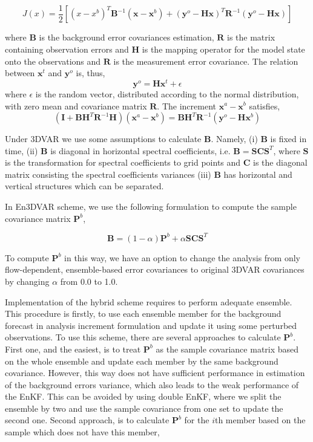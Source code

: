 \documentclass[a4,12pt]{article}
\numberwithin{equation}{section}
\begin{document}
$$J(x) = \frac{1}{2}[(x-x^{b})^{T}\textbf{B}^{-1}(\textbf{x}-\textbf{x}^{b})+(\textbf{y}^{o}-\textbf{H}\textbf{x})^{T}\textbf{R}^{-1}(\textbf{y}^{o}-\textbf{Hx})]$$

where $\textbf{B}$ is the background error covariances estimation, $\textbf{R}$ is the matrix containing observation errors and $\textbf{H}$ is the mapping operator for the model state onto the observations and  $\textbf{R}$ is the measurement error covariance. The relation between $\textbf{x}^{t}$ and $\textbf{y}^{o}$ is, thus, $$\textbf{y}^{o} = \textbf{H}\textbf{x}^{t} + \epsilon$$ where $\epsilon$ is the random vector, distributed according to the normal distribution, with zero mean and covariance matrix $\textbf{R}$. The increment $\textbf{x}^{a} - \textbf{x}^{b}$ satisfies, 
$$(\textbf{I} + \textbf{BH}^{T}\textbf{R}^{-1}\textbf{H})(\textbf{x}^{a}-\textbf{x}^{b}) = \textbf{B}\textbf{H}^{T}\textbf{R}^{-1}(\textbf{y}^{o}-\textbf{H}\textbf{x}^{b})$$   

Under 3DVAR we use some assumptions to calculate $\textbf{B}$. Namely, (i) $\textbf{B}$ is fixed in time, (ii) $\textbf{B}$ is diagonal in horizontal spectral coefficients, i.e. $\textbf{B} = \textbf{S}\textbf{C}\textbf{S}^{T}$, where $\textbf{S}$ is the transformation for spectral coefficients to grid points and $\textbf{C}$ is the diagonal matrix consisting the spectral coefficients variances (iii) $\textbf{B}$ has horizontal and vertical structures which can be separated.

In En3DVAR scheme, we use the following formulation to compute the sample covariance matrix $\textbf{P}^{b}$,

$$\textbf{B} = (1 - \alpha)\textbf{P}^{b} + \alpha \textbf{S}\textbf{C}\textbf{S}^{T}$$

To compute $\textbf{P}^{b}$ in this way, we have an option to change the analysis from only flow-dependent, ensemble-based error covariances to original 3DVAR covariances by changing $\alpha$ from 0.0 to 1.0.

Implementation of the hybrid scheme requires to perform adequate ensemble. This procedure is firstly, to use each ensemble member for the background forecast in analysis increment formulation and update it using some perturbed observations. To use this scheme, there are several approaches to calculate $\textbf{P}^{b}$. First one, and the easiest, is to treat $\textbf{P}^{b}$ as the sample covariance matrix based on the whole ensemble and update each member by the same background covariance. However, this way does not have sufficient performance in estimation of the background errors variance, which also leads to the weak performance of the EnKF. This can be avoided by using double EnKF, where we split the ensemble by two and use the sample covariance from one set to update the second one. Second approach, is to calculate $\textbf{P}^{b}$ for the $i$th member based on the sample which does not have this member, 
\end{document}
